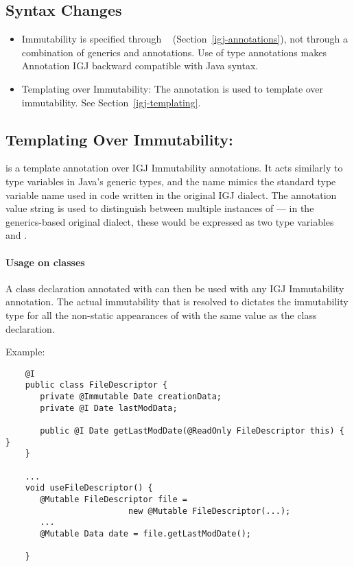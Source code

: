 \subsection{Syntax Changes}

\begin{itemize}

\item  Immutability is specified through
  ~\cite{jsr308} (Section~\ref{igj-annotations}),
not through a combination of generics and annotations.  Use of type
annotations makes Annotation IGJ backward compatible with Java syntax.

\item Templating over Immutability: The annotation  is used to template
over immutability.  See Section~\ref{igj-templating}.

\end{itemize}


\subsection{Templating Over Immutability: \label{igj-templating}}

 is a template annotation over IGJ Immutability annotations. It acts
similarly to type variables in Java's generic types, and the name
 mimics the standard  type variable name used in code
written in the original IGJ dialect.  The annotation value string is used
to distinguish between multiple instances of  --- in the
generics-based original dialect, these would be expressed as two type
variables  and .

\paragraph{Usage on classes\label{igj-usage-on-classes}}

A class declaration annotated with  can then be
used with any IGJ Immutability annotation.  The actual immutability that
 is resolved to dictates the immutability type for all the non-static
appearances of  with the same value as the class declaration.

  Example:
\begin{Verbatim}
    @I
    public class FileDescriptor {
       private @Immutable Date creationData;
       private @I Date lastModData;

       public @I Date getLastModDate(@ReadOnly FileDescriptor this) { }
    }

    ...
    void useFileDescriptor() {
       @Mutable FileDescriptor file =
                         new @Mutable FileDescriptor(...);
       ...
       @Mutable Data date = file.getLastModDate();

    }
\end{Verbatim}

